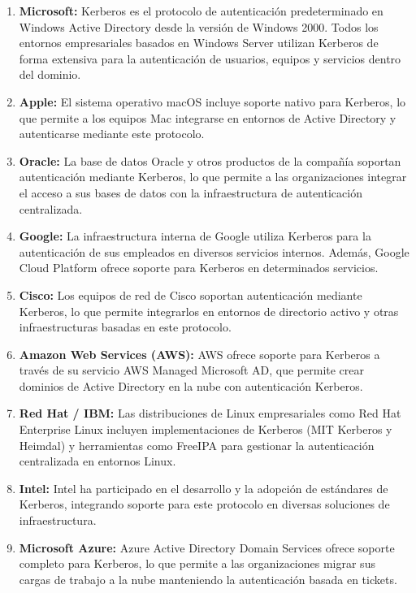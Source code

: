 \documentclass[letterpaper,12pt]{article}
\begin{document}
\begin{enumerate}[leftmargin=2cm]
  \item \textbf{Microsoft:} Kerberos es el protocolo de autenticaci\'on predeterminado en Windows Active Directory desde la versi\'on de Windows 2000. Todos los entornos empresariales basados en Windows Server utilizan Kerberos de forma extensiva para la autenticaci\'on de usuarios, equipos y servicios dentro del dominio.

  \item \textbf{Apple:} El sistema operativo macOS incluye soporte nativo para Kerberos, lo que permite a los equipos Mac integrarse en entornos de Active Directory y autenticarse mediante este protocolo.

  \item \textbf{Oracle:} La base de datos Oracle y otros productos de la compa\~n\'ia soportan autenticaci\'on mediante Kerberos, lo que permite a las organizaciones integrar el acceso a sus bases de datos con la infraestructura de autenticaci\'on centralizada.

  \item \textbf{Google:} La infraestructura interna de Google utiliza Kerberos para la autenticaci\'on de sus empleados en diversos servicios internos. Adem\'as, Google Cloud Platform ofrece soporte para Kerberos en determinados servicios.

  \item \textbf{Cisco:} Los equipos de red de Cisco soportan autenticaci\'on mediante Kerberos, lo que permite integrarlos en entornos de directorio activo y otras infraestructuras basadas en este protocolo.

  \item \textbf{Amazon Web Services (AWS):} AWS ofrece soporte para Kerberos a trav\'es de su servicio AWS Managed Microsoft AD, que permite crear dominios de Active Directory en la nube con autenticaci\'on Kerberos.

  \item \textbf{Red Hat / IBM:} Las distribuciones de Linux empresariales como Red Hat Enterprise Linux incluyen implementaciones de Kerberos (MIT Kerberos y Heimdal) y herramientas como FreeIPA para gestionar la autenticaci\'on centralizada en entornos Linux.

  \item \textbf{Intel:} Intel ha participado en el desarrollo y la adopci\'on de est\'andares de Kerberos, integrando soporte para este protocolo en diversas soluciones de infraestructura.

  \item \textbf{Microsoft Azure:} Azure Active Directory Domain Services ofrece soporte completo para Kerberos, lo que permite a las organizaciones migrar sus cargas de trabajo a la nube manteniendo la autenticaci\'on basada en tickets.
\end{enumerate}
\end{document}
